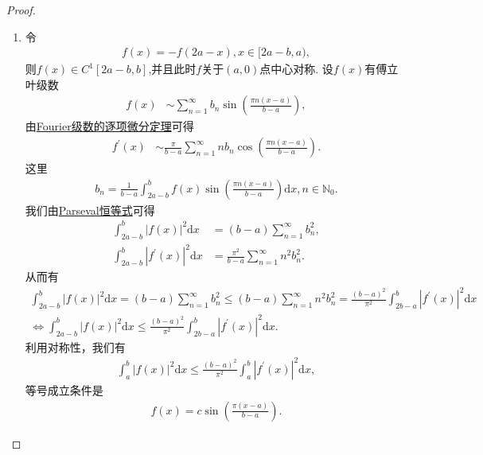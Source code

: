 \documentclass[../../main.tex]{subfiles}
\begin{document}
\begin{proof}
\begin{enumerate}[(1)]
\item 令
\begin{align*}
f(x)=-f(2a - x), x\in[2a - b,a),
\end{align*}
则$f(x)\in C^1[2a - b,b]$,并且此时$f$关于$(a,0)$点中心对称.
设$f(x)$有傅立叶级数
\begin{align*}
f(x) &\sim \sum_{n = 1}^{\infty}b_n\sin\left(\frac{\pi n(x - a)}{b - a}\right),
\end{align*}
由\hyperref[theorem:Fourier级数的逐项微分定理]{Fourier级数的逐项微分定理}可得
\begin{align*}
f^{\prime}(x) &\sim \frac{\pi}{b - a}\sum_{n = 1}^{\infty}nb_n\cos\left(\frac{\pi n(x - a)}{b - a}\right).
\end{align*}
这里
\begin{align*}
b_n=\frac{1}{b - a}\int_{2a - b}^{b}f(x)\sin\left(\frac{\pi n(x - a)}{b - a}\right)\mathrm{d}x, n\in\mathbb{N}_0.
\end{align*}
我们由\hyperref[theorem:Parseval恒等式]{Parseval恒等式}可得
\begin{align*}
\int_{2a - b}^{b}|f(x)|^2\mathrm{d}x&=(b - a)\sum_{n = 1}^{\infty}b_n^2,\\
\int_{2a - b}^{b}|f^{\prime}(x)|^2\mathrm{d}x&=\frac{\pi^2}{b - a}\sum_{n = 1}^{\infty}n^2b_n^2.
\end{align*}
从而有
\begin{gather*}
\int_{2a-b}^b{|f(x)|^2\mathrm{d}x}=\left( b-a \right) \sum_{n=1}^{\infty}{b_{n}^{2}}\leqslant \left( b-a \right) \sum_{n=1}^{\infty}{n^2b_{n}^{2}}=\frac{(b-a)^2}{\pi ^2}\int_{2b-a}^b{|f^{\prime}(x)|^2\mathrm{d}x}
\\
\Longleftrightarrow \int_{2a-b}^b{|f(x)|^2\mathrm{d}x}\leqslant \frac{(b-a)^2}{\pi ^2}\int_{2b-a}^b{|f^{\prime}(x)|^2\mathrm{d}x}.
\end{gather*}
利用对称性，我们有
\begin{align*}
\int_{a}^{b}|f(x)|^2\mathrm{d}x\leqslant \frac{(b - a)^2}{\pi^2}\int_{a}^{b}|f^{\prime}(x)|^2\mathrm{d}x,
\end{align*}
等号成立条件是
\begin{align*}
f(x)=c\sin\left(\frac{\pi(x - a)}{b - a}\right).
\end{align*} 
\end{enumerate}

\end{proof}
\end{document}
